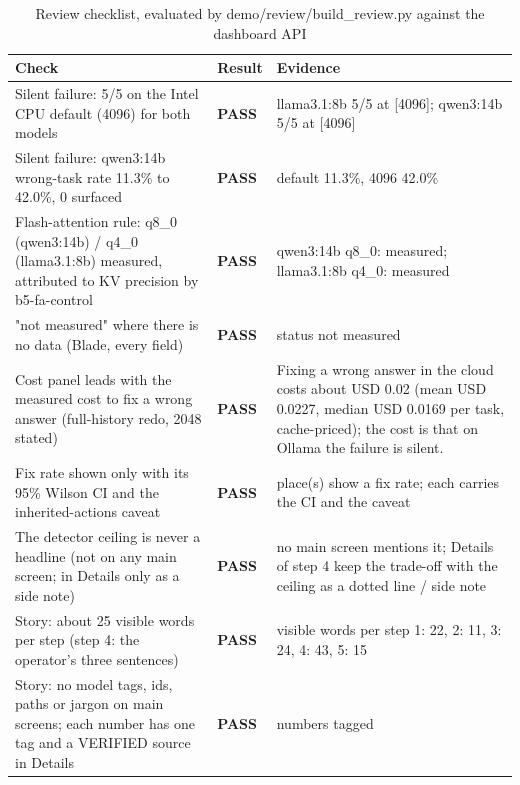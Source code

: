 \begin{longtable}{>{\raggedright\arraybackslash}p{}p{}>{\raggedright\arraybackslash}p{}}
\caption{Review checklist, evaluated by demo/review/build\_review.py against the dashboard API}\label{tab:check}\\\toprule
\textbf{Check} & \textbf{Result} & \textbf{Evidence} \\
\midrule\endhead
Silent failure: 5/5 on the Intel CPU default (4096) for both models & \textbf{PASS} & llama3.1:8b 5/5 at [4096]; qwen3:14b 5/5 at [4096] \\

Silent failure: qwen3:14b wrong-task rate 11.3\% to 42.0\%, 0 surfaced & \textbf{PASS} & default 11.3\%, 4096 42.0\% \\

Flash-attention rule: q8\_0 (qwen3:14b) / q4\_0 (llama3.1:8b) measured, attributed to KV precision by b5-fa-control & \textbf{PASS} & qwen3:14b q8\_0: measured; llama3.1:8b q4\_0: measured \\

"not measured" where there is no data (Blade, every field) & \textbf{PASS} & status not measured \\

Cost panel leads with the measured cost to fix a wrong answer (full-history redo, 2048 stated) & \textbf{PASS} & Fixing a wrong answer in the cloud costs about USD 0.02 (mean USD 0.0227, median USD 0.0169 per task, cache-priced); the cost is that on Ollama the failure is silent. \\

Fix rate shown only with its 95\% Wilson CI and the inherited-actions caveat & \textbf{PASS} & 2 place(s) show a fix rate; each carries the CI and the caveat \\

The detector ceiling is never a headline (not on any main screen; in Details only as a side note) & \textbf{PASS} & no main screen mentions it; Details of step 4 keep the trade-off with the ceiling as a dotted line / side note \\

Story: about 25 visible words per step (step 4: the operator's three sentences) & \textbf{PASS} & visible words per step 1: 22, 2: 11, 3: 24, 4: 43, 5: 15 \\

Story: no model tags, ids, paths or jargon on main screens; each number has one tag and a VERIFIED source in Details & \textbf{PASS} & 10 numbers tagged \\


\end{longtable}
